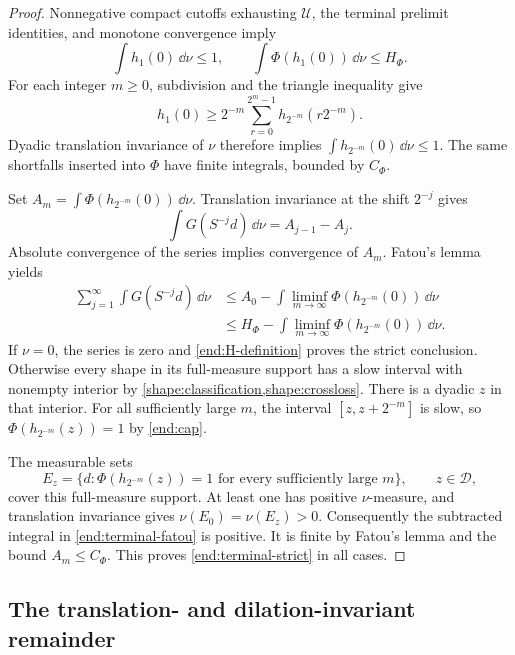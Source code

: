 \begin{proof}
Nonnegative compact cutoffs exhausting $\mathcal U$, the terminal
prelimit identities, and monotone convergence imply
\begin{equation}\label{end:terminal-bounds}
 \int h_1(0)\,\dd\nu\le1,
 \qquad \int\Phi(h_1(0))\,\dd\nu\le H_\Phi.
\end{equation}
For each integer $m\ge0$, subdivision and the triangle inequality give
\[
 h_1(0)\ge2^{-m}\sum_{r=0}^{2^m-1}h_{2^{-m}}(r2^{-m}).
\]
Dyadic translation invariance of $\nu$ therefore implies
$\int h_{2^{-m}}(0)\,\dd\nu\le1$.  The same shortfalls inserted into
$\Phi$ have finite integrals, bounded by $C_\Phi$.

Set $A_m=\int\Phi(h_{2^{-m}}(0))\,\dd\nu$.  Translation invariance
at the shift $2^{-j}$ gives
\[
 \int G(S^{-j}d)\,\dd\nu=A_{j-1}-A_j.
\]
Absolute convergence of the series implies convergence of $A_m$.
Fatou's lemma yields
\begin{align}
 \sum_{j=1}^{\infty}\int G(S^{-j}d)\,\dd\nu
 &\le A_0-
    \int\liminf_{m\to\infty}\Phi(h_{2^{-m}}(0))\,\dd\nu
 \nonumber\\
 &\le H_\Phi-
    \int\liminf_{m\to\infty}\Phi(h_{2^{-m}}(0))\,\dd\nu.
 \label{end:terminal-fatou}
\end{align}
If $\nu=0$, the series is zero and \cref{end:H-definition} proves the
strict conclusion.  Otherwise every shape in its full-measure support
has a slow interval with nonempty interior by
\cref{shape:classification,shape:crossloss}.  There is a dyadic $z$ in
that interior.  For all sufficiently large $m$, the interval
$[z,z+2^{-m}]$ is slow, so
$\Phi(h_{2^{-m}}(z))=1$ by \cref{end:cap}.

The measurable sets
\[
 E_z=\{d:\Phi(h_{2^{-m}}(z))=1\text{ for every sufficiently large }m\},
 \qquad z\in\mathcal D,
\]
cover this full-measure support.  At least one has positive $\nu$-measure,
and translation invariance gives $\nu(E_0)=\nu(E_z)>0$.
Consequently the subtracted integral in \cref{end:terminal-fatou} is
positive.  It is finite by Fatou's lemma and the bound $A_m\le C_\Phi$.
This proves \cref{end:terminal-strict} in all cases.
\end{proof}

\subsection{The translation- and dilation-invariant remainder}

